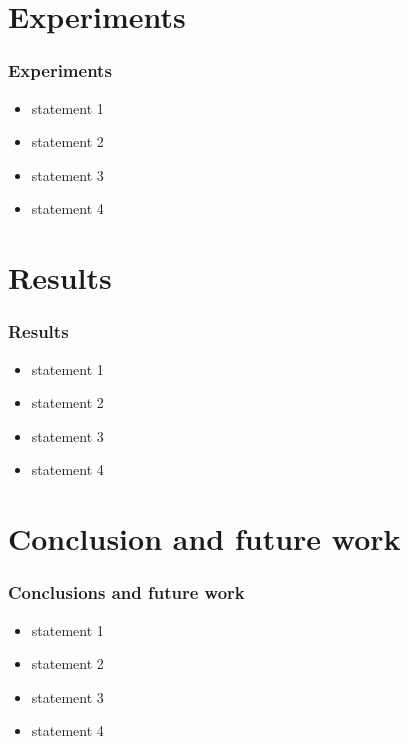 \documentclass{beamer}
\begin{document}
\section{Experiments}
\begin{frame}[allowframebreaks]
\frametitle{Experiments}
\begin{itemize}
\item statement 1
\item statement 2
\item statement 3
\item statement 4
\end{itemize}
\end{frame}
\section{Results}
\begin{frame}[allowframebreaks]
\frametitle{Results}
\begin{itemize}
\item statement 1
\item statement 2
\item statement 3
\item statement 4
\end{itemize}
\end{frame}

\section{Conclusion and future work}
\begin{frame}[allowframebreaks]
\frametitle{Conclusions and future work}
\begin{itemize}
\item statement 1
\item statement 2
\item statement 3
\item statement 4
\end{itemize}
\end{frame}
\end{document}

